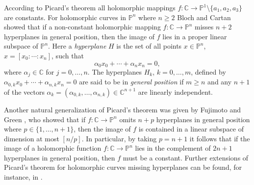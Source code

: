 \documentclass{amsart}
\newcommand{\C}{\mathbb{C}}
\renewcommand{\P}{\mathbb{P}}
\theoremstyle{definition}
\numberwithin{equation}{section}
\numberwithin{theorem}{section}
\begin{document}
According to Picard's theorem all holomorphic mappings
$f:\C\to\P^1\setminus{\{a_1,a_2,a_3\}}$ are constants. For holomorphic
curves in $\P^n$ where $n\geq 2$ Bloch \cite{bloch:26} and Cartan
\cite{cartan:28} showed that if a non-constant holomorphic mapping
$f:\C\to\P^n$ misses $n+2$ hyperplanes in general
position, then the image of $f$ lies in a proper linear subspace of $\P^n$.
Here a \textit{hyperplane} $H$ is the set of all points $x\in\P^n$,
$x=[x_0:\cdots:x_n]$, such that
    \begin{equation}\label{hyperplanedef}
    \alpha_0 x_0+\cdots+\alpha_n x_n = 0,
    \end{equation}
where $\alpha_j\in \C$ for
$j=0,\ldots,n$. The hyperplanes
$H_k$, $k=0,\ldots,m$, defined by $\alpha_{0,k}
x_0+\cdots+\alpha_{n,k} x_n = 0$  are said to be in
\textit{general position} if $m\geq n$ and any $n+1$ of the
vectors $\alpha_k=(\alpha_{0,k},\ldots,\alpha_{n,k})\in \C^{n+1}$
are linearly independent.

Another natural generalization of Picard's theorem was given by
Fujimoto \cite{fujimoto:72b} and Green \cite{green:72}, who showed
that if $f:\C\to\P^n$ omits $n+p$ hyperplanes in general position where $p\in\{1,\ldots,n+1\}$, then the image of $f$ is contained in a linear subspace of dimension at most $[n/p]$. In particular, by taking $p=n+1$ it follows
that if the image of a holomorphic function $f:\C\to\P^n$ lies in
the complement of $2n+1$ hyperplanes in general position, then $f$
must be a constant. Further extensions of Picard's theorem for
holomorphic curves missing hyperplanes can be found, for instance,
in \cite{fujimoto:74,green:74,green:75}.
\end{document}
